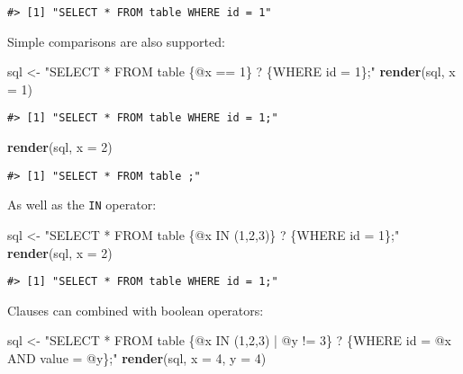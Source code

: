 \documentclass[
]{article}
\newenvironment{Shaded}{\begin{snugshade}}{\end{snugshade}}
\newcommand{\DataTypeTok}[1]{\textcolor[rgb]{0.13,0.29,0.53}{#1}}
\newcommand{\DecValTok}[1]{\textcolor[rgb]{0.00,0.00,0.81}{#1}}
\newcommand{\KeywordTok}[1]{\textcolor[rgb]{0.13,0.29,0.53}{\textbf{#1}}}
\newcommand{\NormalTok}[1]{#1}
\newcommand{\StringTok}[1]{\textcolor[rgb]{0.31,0.60,0.02}{#1}}
\begin{document}
\begin{verbatim}
#> [1] "SELECT * FROM table WHERE id = 1"
\end{verbatim}

Simple comparisons are also supported:

\begin{Shaded}
\begin{Highlighting}[]
\NormalTok{sql <-}\StringTok{ "SELECT * FROM table \{@x == 1\} ? \{WHERE id = 1\};"}
\KeywordTok{render}\NormalTok{(sql, }\DataTypeTok{x =} \DecValTok{1}\NormalTok{)}
\end{Highlighting}
\end{Shaded}

\begin{verbatim}
#> [1] "SELECT * FROM table WHERE id = 1;"
\end{verbatim}

\begin{Shaded}
\begin{Highlighting}[]
\KeywordTok{render}\NormalTok{(sql, }\DataTypeTok{x =} \DecValTok{2}\NormalTok{)}
\end{Highlighting}
\end{Shaded}

\begin{verbatim}
#> [1] "SELECT * FROM table ;"
\end{verbatim}

As well as the \texttt{IN} operator:

\begin{Shaded}
\begin{Highlighting}[]
\NormalTok{sql <-}\StringTok{ "SELECT * FROM table \{@x IN (1,2,3)\} ? \{WHERE id = 1\};"}
\KeywordTok{render}\NormalTok{(sql, }\DataTypeTok{x =} \DecValTok{2}\NormalTok{)}
\end{Highlighting}
\end{Shaded}

\begin{verbatim}
#> [1] "SELECT * FROM table WHERE id = 1;"
\end{verbatim}

Clauses can combined with boolean operators:

\begin{Shaded}
\begin{Highlighting}[]
\NormalTok{sql <-}\StringTok{ "SELECT * FROM table \{@x IN (1,2,3) | @y != 3\} ? \{WHERE id = @x AND value = @y\};"}
\KeywordTok{render}\NormalTok{(sql, }\DataTypeTok{x =} \DecValTok{4}\NormalTok{, }\DataTypeTok{y =} \DecValTok{4}\NormalTok{)}
\end{Highlighting}
\end{Shaded}
\end{document}
